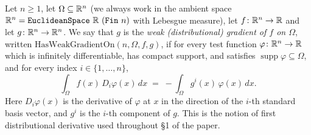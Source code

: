 \begin{definition}
Let $n\ge 1$, let $\Omega\subseteq\mathbb{R}^n$ (we always work in the ambient space
$\R^n=\mathtt{EuclideanSpace}\ \R\ (\mathtt{Fin}\ n)$ with Lebesgue measure), let
$f\colon\mathbb{R}^n\to\mathbb{R}$ and let $g\colon\mathbb{R}^n\to\mathbb{R}^n$. We say that $g$ is the
\emph{weak (distributional) gradient of $f$ on $\Omega$}, written
$\mathrm{HasWeakGradientOn}(n,\Omega,f,g)$, if for every test function
$\varphi\colon\mathbb{R}^n\to\mathbb{R}$ which is infinitely differentiable, has compact
support, and satisfies $\operatorname{supp}\varphi\subseteq\Omega$, and for every
index $i\in\{1,\dots,n\}$,
\[
\int_\Omega f(x)\,D_i\varphi(x)\,dx \;=\; -\int_\Omega g^i(x)\,\varphi(x)\,dx .
\]
Here $D_i\varphi(x)$ is the derivative of $\varphi$ at $x$ in the direction of
the $i$-th standard basis vector, and $g^i$ is the $i$-th component of $g$.
This is the notion of first distributional derivative used throughout \S1 of the
paper.
\end{definition}
